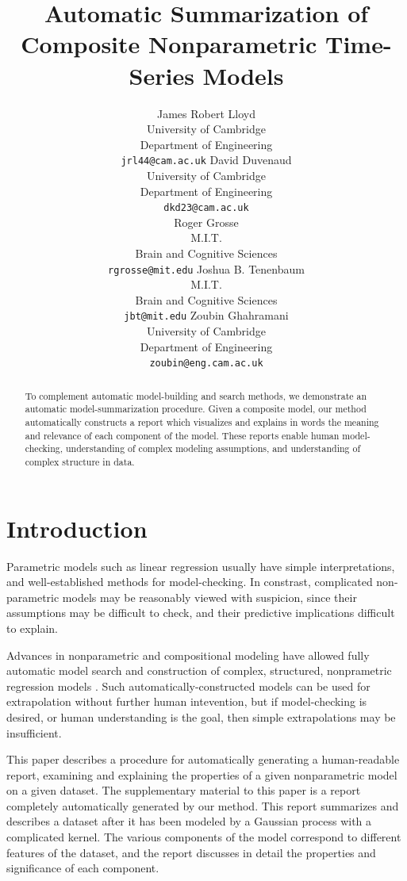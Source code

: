 \documentclass{article} %
\title{Automatic Summarization of Composite Nonparametric Time-Series Models}
\author{
James Robert Lloyd\\
University of Cambridge\\
Department of Engineering\\
\texttt{jrl44@cam.ac.uk}
\And
David Duvenaud\\
University of Cambridge \\
Department of Engineering \\
\texttt{dkd23@cam.ac.uk} \\
\And
Roger Grosse\\
M.I.T.\\
Brain and Cognitive Sciences \\
\texttt{rgrosse@mit.edu}
\And
Joshua B. Tenenbaum\\
M.I.T.\\
Brain and Cognitive Sciences \\
\texttt{jbt@mit.edu}
\And
Zoubin Ghahramani\\
University of Cambridge \\
Department of Engineering \\
\texttt{zoubin@eng.cam.ac.uk}
}
\begin{document}
\allowdisplaybreaks

\maketitle

\begin{abstract}
To complement automatic model-building and search methods, we demonstrate an automatic model-summarization procedure.  Given a composite model, our method automatically constructs a report which visualizes and explains in words the meaning and relevance of each component of the model.  These reports enable human model-checking, understanding of complex modeling assumptions, and understanding of complex structure in data.
\end{abstract}

\section{Introduction}



Parametric models such as linear regression usually have simple interpretations, and well-established methods for model-checking.  In constrast, complicated non-parametric models may be reasonably viewed with suspicion, since their assumptions may be difficult to check, and their predictive implications difficult to explain.

Advances in nonparametric and compositional modeling have allowed fully automatic model search and construction of complex, structured, nonprametric regression models \cite{DuvLloGroetal13}.  Such automatically-constructed models can be used for extrapolation without further human intevention, but if model-checking is desired, or human understanding is the goal, then simple extrapolations may be insufficient.  

This paper describes a procedure for automatically generating a human-readable report, examining and explaining the properties of a given nonparametric model on a given dataset.  The supplementary material to this paper is a report completely automatically generated by our method.  This report summarizes and describes a dataset after it has been modeled by a Gaussian process with a complicated kernel.  The various components of the model correspond to different features of the dataset, and the report discusses in detail the properties and significance of each component.
\end{document}
